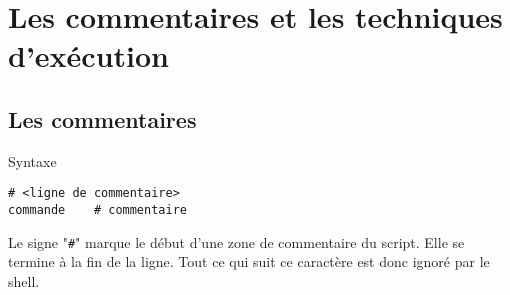 %
%

\setcounter{remarque-cnt}{1}
\setcounter{example-cnt}{1}
\chapter{Les commentaires et les techniques d'ex{\'e}cution}

\section{\label{commexec-comments}Les commentaires}

\begin{definition}{Syntaxe}
\begin{verbatim}
# <ligne de commentaire>
commande	# commentaire
\end{verbatim}
\end{definition}

Le signe "\verb=#=" marque le d{\'e}but d{'}une zone de commentaire du script.
Elle se termine {\`a} la fin de la ligne. Tout ce qui suit ce caract{\`e}re est donc ignor{\'e} par le shell.

